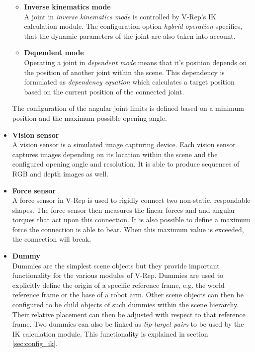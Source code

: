 \begin{itemize}
\begin{itemize}
\item \textbf{Inverse kinematics mode} \\
A joint in \emph{inverse kinematics mode} is controlled by V-Rep's IK calculation module. The configuration option \emph{hybrid operation} specifies, that the dynamic parameters of the joint are also taken into account.

\item \textbf{Dependent mode} \\
Operating a joint in \emph{dependent mode} means that it's position depends on the position of another joint within the scene. This dependency is formulated as \emph{dependency equation} which calculates a target position based on the current position of the connected joint.

\end{itemize}
The configuration of the angular joint limits is defined based on a minimum position and the maximum possible opening angle. 

\item \textbf{Vision sensor} \\
A vision sensor is a simulated image capturing device. Each vision sensor captures images depending on its location within the scene and the configured opening angle and resolution. It is able to produce sequences of RGB and depth images as well.

\item \textbf{Force sensor} \\
A force sensor in V-Rep is used to rigidly connect two non-static, respondable shapes. The force sensor then measures the linear forces and and angular torques that act upon this connection. It is also possible to define a maximum force the connection is able to bear. When this maximum value is exceeded, the connection will break.

\item \textbf{Dummy} \\
Dummies are the simplest scene objects but they provide important functionality for the various modules of V-Rep. Dummies are used to explicitly define the origin of a specific reference frame, e.g. the world reference frame or the base of a robot arm. Other scene objects can then be configured to be child objects of such dummies within the scene hierarchy. Their relative placement can then be adjusted with respect to that reference frame. Two dummies can also be linked as \emph{tip-target pairs} to be used by the IK calculation module. This functionality is explained in section \ref{sec:config_ik}.

\end{itemize}

